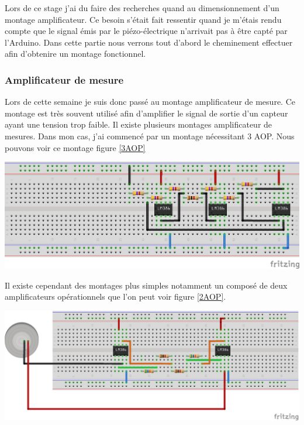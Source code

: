 \documentclass[11pt,french,a4paper]{article}
\begin{document}
Lors de ce stage j'ai du faire des recherches quand au dimensionnement d'un montage amplificateur. Ce besoin s'était fait ressentir quand je m'étais rendu compte que le signal émis par le piézo-électrique n'arrivait pas à être capté par l'Arduino.  Dans cette partie nous verrons tout d'abord le cheminement effectuer afin d'obtenire un montage fonctionnel. 

\subsubsection{Amplificateur de mesure}

Lors de cette semaine je suis donc passé au montage amplificateur de mesure. Ce montage est très souvent utilisé afin d’amplifier le signal de sortie d’un capteur ayant une tension trop faible.
Il existe plusieurs montages amplificateur de mesures. Dans mon cas, j’ai commencé par un montage nécessitant 3 AOP. Nous pouvons voir ce montage figure \ref{3AOP}

\begin{center}	
\includegraphics[scale=1]{../img/instrumentation3aop_bb.png}
\label{3AOP}
\end{center}


Il existe cependant des montages plus simples notamment un composé de deux amplificateurs opérationnels que l'on peut voir figure \ref{2AOP}.
\\

\begin{center}	
\includegraphics[scale=0.80]{../img/instrumentation2aop_bb.png}
\label{2AOP}
\end{center}
\end{document}
